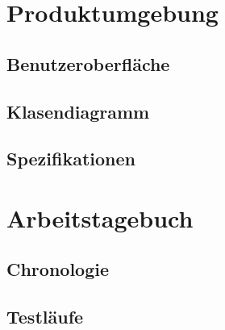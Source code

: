 \documentclass{article}
\begin{document}

\section{Produktumgebung}\label{section-product}

\subsection{Benutzeroberfläche}
\subsection{Klasendiagramm}
\subsection{Spezifikationen}


\newpage
\section{Arbeitstagebuch}\label{section-diary}

\subsection{Chronologie}
\subsection{Testläufe}


\end{document}
